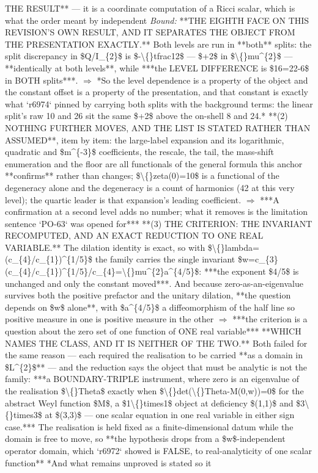 \begin{description}
THE RESULT** --- it is a coordinate computation of a Ricci scalar, which is what the order meant by independent
 \emph{Bound:}  **THE EIGHTH FACE ON THIS REVISION'S OWN RESULT, AND IT SEPARATES THE OBJECT FROM THE PRESENTATION EXACTLY.** Both levels are run in **both** splits: the split discrepancy in \$Q/I\_\{2\}\$ is \$-\textbackslash\{\}tfrac12\$ --- \$+2\$ in \$\textbackslash\{\}mu\textasciicircum{}\{2\}\$ --- **identically at both levels**, while ***the LEVEL DIFFERENCE is \$16=22-6\$ in BOTH splits***. \ensuremath{\Rightarrow} *So the level dependence is a property of the object and the constant offset is a property of the presentation, and that constant is exactly what `r6974` pinned by carrying both splits with the background terms: the linear split's raw 10 and 26 sit the same \$+2\$ above the on-shell 8 and 24.*  **(2) NOTHING FURTHER MOVES, AND THE LIST IS STATED RATHER THAN ASSUMED**, item by item: the large-label expansion and its logarithmic, quadratic and \$m\textasciicircum{}\{-3\}\$ coefficients, the rescale, the tail, the mass-shift enumeration and the floor are all functionals of the general formula this anchor **confirms** rather than changes; \$\textbackslash\{\}zeta(0)=10\$ is a functional of the degeneracy alone and the degeneracy is a count of harmonics (42 at this very level); the quartic leader is that expansion's leading coefficient. \ensuremath{\Rightarrow} ***A confirmation at a second level adds no number; what it removes is the limitation sentence `PO-63` was opened for***  **(3) THE CRITERION: THE INVARIANT RECOMPUTED, AND AN EXACT REDUCTION TO ONE REAL VARIABLE.** The dilation identity is exact, so with \$\textbackslash\{\}lambda=(c\_\{4\}/c\_\{1\})\textasciicircum{}\{1/5\}\$ the family carries the single invariant \$w=c\_\{3\}(c\_\{4\}/c\_\{1\})\textasciicircum{}\{1/5\}/c\_\{4\}=\textbackslash\{\}mu\textasciicircum{}\{2\}a\textasciicircum{}\{4/5\}\$: ***the exponent \$4/5\$ is unchanged and only the constant moved***. And because zero-as-an-eigenvalue survives both the positive prefactor and the unitary dilation, **the question depends on \$w\$ alone**, with \$a\textasciicircum{}\{4/5\}\$ a diffeomorphism of the half line so positive measure in one is positive measure in the other \ensuremath{\Rightarrow} ***the criterion is a question about the zero set of one function of ONE real variable***  **WHICH NAMES THE CLASS, AND IT IS NEITHER OF THE TWO.** Both failed for the same reason --- each required the realisation to be carried **as a domain in \$L\textasciicircum{}\{2\}\$** --- and the reduction says the object that must be analytic is not the family: ***a BOUNDARY-TRIPLE instrument, where zero is an eigenvalue of the realisation \$\textbackslash\{\}Theta\$ exactly when \$\textbackslash\{\}det(\textbackslash\{\}Theta-M(0,w))=0\$ for the abstract Weyl function \$M\$, a \$1\textbackslash\{\}times1\$ object at deficiency \$(1,1)\$ and \$3\textbackslash\{\}times3\$ at \$(3,3)\$ --- one scalar equation in one real variable in either sign case.*** The realisation is held fixed as a finite-dimensional datum while the domain is free to move, so **the hypothesis drops from a \$w\$-independent operator domain, which `r6972` showed is FALSE, to real-analyticity of one scalar function**  *And what remains unproved is stated so it 
\end{description}
